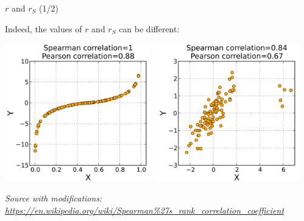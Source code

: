 \documentclass{beamer}
\begin{document}
\begin{frame}
{\centerline{$r$ and $r_S$ (1/2)}}

Indeed, the values of $r$ and $r_S$ can be different:

\begin{center}
\includegraphics[width=0.475\textwidth]{A2022.IDSEPC.Correlazione/600px-Spearman_fig1.png}
\includegraphics[width=0.475\textwidth]{A2022.IDSEPC.Correlazione/600px-Spearman_fig3.png}

\end{center} 

\textit{\tiny
\vspace{-\baselineskip}
Source with modifications: \url{https://en.wikipedia.org/wiki/Spearman\%27s_rank_correlation_coefficient}}

\end{frame}
\end{document}
